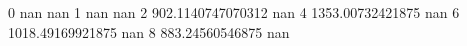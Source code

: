 0 nan nan
1 nan nan
2 902.1140747070312 nan
4 1353.00732421875 nan
6 1018.49169921875 nan
8 883.24560546875 nan
